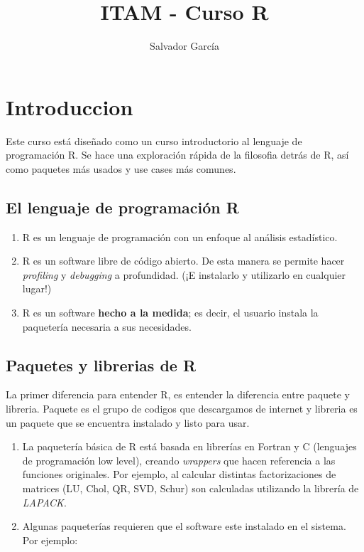 \documentclass[]{book}
\title{ITAM - Curso R}
\author{Salvador García}
\date{}
\begin{document}
\maketitle

{
\setcounter{tocdepth}{1}
\tableofcontents
}
\hypertarget{introduccion}{%
\chapter{Introduccion}\label{introduccion}}

Este curso está diseñado como un curso introductorio al lenguaje de programación R. Se hace una exploración rápida de la filosofia detrás de R, así como paquetes más usados y use cases más comunes.

\hypertarget{el-lenguaje-de-programaciuxf3n-r}{%
\section{El lenguaje de programación R}\label{el-lenguaje-de-programaciuxf3n-r}}

\begin{enumerate}
\def\labelenumi{\arabic{enumi}.}
\item
  R es un lenguaje de programación con un enfoque al análisis estadístico.
\item
  R es un software libre de código abierto. De esta manera se permite hacer \emph{profiling} y \emph{debugging} a profundidad. (¡E instalarlo y utilizarlo en cualquier lugar!)
\item
  R es un software \textbf{hecho a la medida}; es decir, el usuario instala la paquetería necesaria a sus necesidades.
\end{enumerate}

\hypertarget{paquetes-y-librerias-de-r}{%
\section{Paquetes y librerias de R}\label{paquetes-y-librerias-de-r}}

La primer diferencia para entender R, es entender la diferencia entre paquete y libreria. Paquete es el grupo de codigos que descargamos de internet y libreria es un paquete que se encuentra instalado y listo para usar.

\begin{enumerate}
\def\labelenumi{\arabic{enumi}.}
\item
  La paquetería básica de R está basada en librerías en Fortran y C (lenguajes de programación low level), creando \emph{wrappers} que hacen referencia a las funciones originales. Por ejemplo, al calcular distintas factorizaciones de matrices (LU, Chol, QR, SVD, Schur) son calculadas utilizando la librería de \emph{LAPACK}.
\item
  Algunas paqueterías requieren que el software este instalado en el sistema. Por ejemplo:
\end{enumerate}
\end{document}
